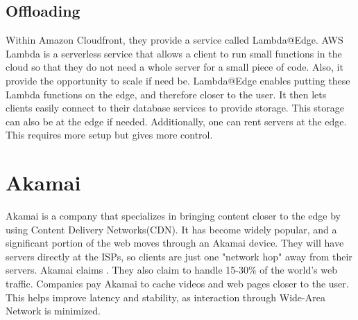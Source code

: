 \subsection{Offloading}
Within Amazon Cloudfront, they provide a service called Lambda@Edge. AWS Lambda is a serverless service that allows a client to run small functions in the cloud so that they do not need a whole server for a small piece of code. Also, it provide the opportunity to scale if need be. Lambda@Edge enables putting these Lambda functions on the edge, and therefore closer to the user. It then lets clients easily connect to their database services to provide storage. This storage can also be at the edge if needed. Additionally, one can rent servers at the edge. This requires more setup but gives more control.




\section{Akamai}
Akamai is a company that specializes in bringing content closer to the edge by using Content Delivery Networks(CDN). It has become widely popular, and a significant portion of the web moves through an Akamai device. They will have servers directly at the ISPs, so clients are just one "network hop" away from their servers. Akamai\cite{noauthor_exceptional_nodate} claims . They also claim to handle 15-30\% of the world's web traffic. Companies pay Akamai to cache videos and web pages closer to the user. This helps improve latency and stability, as interaction through Wide-Area Network is minimized. 


